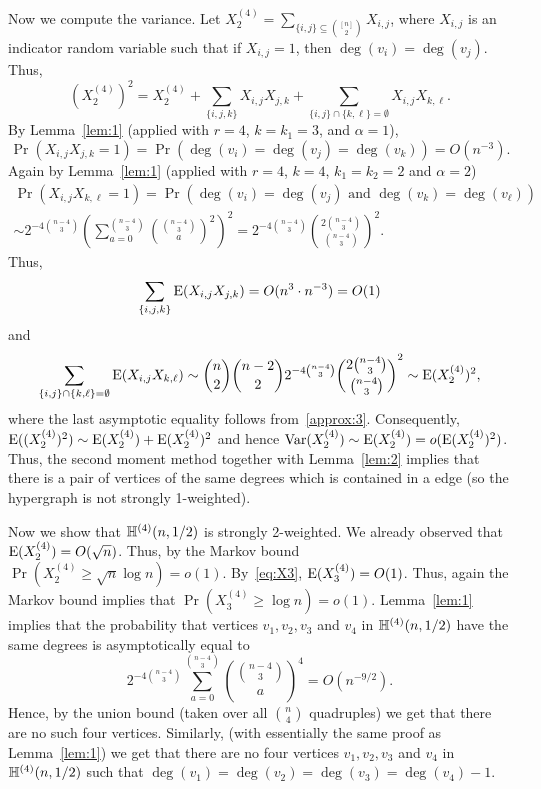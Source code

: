 \documentclass[12pt,reqno]{amsart}
\begin{document}
Now we compute the variance.
Let $X_2^{(4)} = \sum_{\{i,j\} \subseteq \binom{[n]}{2}} X_{i,j}$, where $X_{i,j}$ is an indicator random variable such that if $X_{i,j}=1$, then $\deg(v_i)=\deg(v_j)$. Thus,
\[
(X_2^{(4)})^2 = X_2^{(4)} + \sum_{\{i,j,k\}} X_{i,j} X_{j,k} + \sum_{\{i,j\} \cap \{k,\ell\}=\emptyset} X_{i,j} X_{k,\ell}.
\]
By Lemma~\ref{lem:1} (applied with $r=4$, $k=k_1=3$, and $\alpha=1$),
\[
\Pr(X_{i,j} X_{j,k} = 1) = \Pr(\deg(v_i)=\deg(v_j)=\deg(v_k)) = O(n^{-3}).
\]
Again by  Lemma~\ref{lem:1} (applied with $r=4$, $k=4$, $k_1=k_2=2$ and $\alpha=2$)
\begin{multline*}
\Pr(X_{i,j} X_{k,\ell} = 1) = \Pr(\deg(v_i)=\deg(v_j) \text{ and } \deg(v_k)=\deg(v_\ell))\\
\sim 2^{-4\binom{n-4}{3}} \left( \sum_{a=0}^{\binom{n-4}{3}} \binom{\binom{n-4}{3}}{a}^{2} \right)^2 
=2^{-4\binom{n-4}{3}} \binom{2\binom{n-4}{3}}{\binom{n-4}{3}}^2.
\end{multline*}
Thus,
\[
\sum_{\{i,j,k\}} \mathrm{E}(X_{i,j} X_{j,k}) = O(n^3 \cdot n^{-3}) = O(1)
\]
and
\begin{align*}
\sum_{\{i,j\} \cap \{k,\ell\}=\emptyset} \mathrm{E}(X_{i,j} X_{k,\ell})
\sim \binom{n}{2}\binom{n-2}{2} 2^{-4\binom{n-4}{3}} \binom{2\binom{n-4}{3}}{\binom{n-4}{3}}^2
\sim \mathrm{E}(X_2^{(4)})^2,
\end{align*}
where the last asymptotic equality follows from~\ref{approx:3}. 
Consequently, $\mathrm{E}((X_2^{(4)})^2)\sim \mathrm{E}(X_2^{(4)}) + \mathrm{E}(X_2^{(4)})^2$ and hence $\mathrm{Var}(X_2^{(4)})\sim \mathrm{E}(X_2^{(4)}) = o(\mathrm{E}(X_2^{(4)})^2)$. Thus, the second moment method together with Lemma~\ref{lem:2} implies that \whp there is a pair of vertices of the same degrees which is contained in a edge (so the hypergraph is not strongly 1-weighted).

Now we show that \whp $\mathbb{H}^{({4})}(n,1/2)$ is strongly 2-weighted. We already observed that $\mathrm{E}(X_2^{(4)}) = O(\sqrt{n})$. Thus, by the Markov bound $\Pr(X_2^{(4)} \ge \sqrt{n}\log n) = o(1)$. By~\eqref{eq:X3}, $\mathrm{E}(X_3^{(4)})=O(1)$. Thus, again the Markov bound implies that $\Pr(X_3^{(4)} \ge \log n) = o(1)$. 
Lemma~\ref{lem:1} implies that the probability that vertices $v_1,v_2,v_3$ and $v_4$ in $\mathbb{H}^{({4})}(n,1/2)$ have the same degrees is asymptotically equal to
\[
2^{-4\binom{n-4}{3}} \sum_{a=0}^{\binom{n-4}{3}} \binom{\binom{n-4}{3}}{a}^4 = O(n^{-9/2}).
\]
Hence, by the union bound (taken over all $\binom{n}{4}$ quadruples) we get that \whp there are no such four vertices. Similarly, 
(with essentially the same proof as Lemma~\ref{lem:1}) we get that \whp there are no four vertices $v_1,v_2,v_3$ and $v_4$ in $\mathbb{H}^{({4})}(n,1/2)$ such that $\deg(v_1)=\deg(v_2)=\deg(v_3)=\deg(v_4)-1$.
\end{document}
